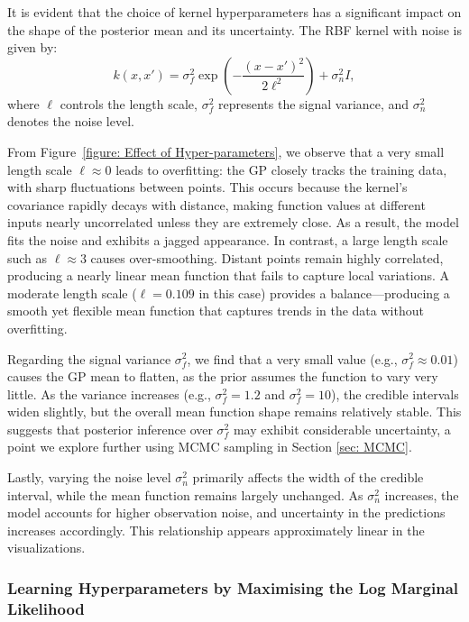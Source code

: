 \documentclass{article}
\begin{document}
\noindent
It is evident that the choice of kernel hyperparameters has a significant impact on the shape of the posterior mean and its uncertainty.
The RBF kernel with noise is given by:
\[
k(x, x') = \sigma_f^2 \exp\left( -\frac{(x - x')^2}{2\ell^2} \right) + \sigma_n^2 I,
\]
where $\ell$ controls the length scale, $\sigma_f^2$ represents the signal variance, and $\sigma_n^2$ denotes the noise level.

\noindent
From Figure~\ref{figure: Effect of Hyper-parameters}, we observe that a very small length scale $\ell \approx 0$ leads to overfitting:
the GP closely tracks the training data, with sharp fluctuations between points. This occurs because the kernel's covariance rapidly decays with distance,
making function values at different inputs nearly uncorrelated unless they are extremely close. As a result, the model fits the noise and exhibits a jagged appearance.
In contrast, a large length scale such as $\ell \approx 3$ causes over-smoothing. Distant points remain highly correlated,
producing a nearly linear mean function that fails to capture local variations. A moderate length scale ($\ell = 0.109$ in this case)
provides a balance—producing a smooth yet flexible mean function that captures trends in the data without overfitting.

\noindent
Regarding the signal variance $\sigma_f^2$, we find that a very small value (e.g., $\sigma_f^2 \approx 0.01$) causes the GP mean to flatten,
as the prior assumes the function to vary very little. As the variance increases (e.g., $\sigma_f^2 = 1.2$ and $\sigma_f^2 = 10$), the credible intervals widen slightly,
but the overall mean function shape remains relatively stable. This suggests that posterior inference over $\sigma_f^2$ may exhibit considerable uncertainty, a point we explore further using MCMC sampling in Section \ref{sec: MCMC}.


\noindent
Lastly, varying the noise level $\sigma_n^2$ primarily affects the width of the credible interval, 
while the mean function remains largely unchanged. As $\sigma_n^2$ increases, the model accounts for higher observation noise, 
and uncertainty in the predictions increases accordingly. This relationship appears approximately linear in the visualizations.


\subsubsection{Learning Hyperparameters by Maximising the Log Marginal Likelihood}
\label{sec: hyperparam optimisation}
\end{document}
